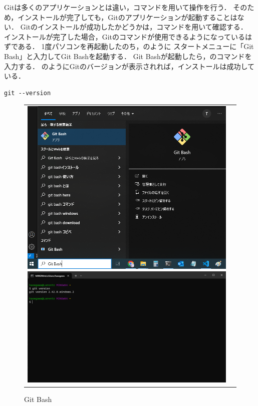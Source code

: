 Gitは多くのアプリケーションとは違い，コマンドを用いて操作を行う．
そのため，インストールが完了しても，Gitのアプリケーションが起動することはない．
Gitのインストールが成功したかどうかは，コマンドを用いて確認する．
インストールが完了した場合，Gitのコマンドが使用できるようになっているはずである．
1度パソコンを再起動したのち，のように
スタートメニューに「Git Bash」と入力してGit Bashを起動する．
Git Bashが起動したら，のコマンドを入力する．
のようにGitのバージョンが表示されれば，インストールは成功している．

\begin{lstlisting}[caption=Gitのバージョン確認コマンド, label=lst:git_version]
  git --version
\end{lstlisting}

\begin{figure}[h]
  \begin{tabular}{cc}
      \begin{minipage}{.5\textwidth}
          \centering
          \includegraphics[width=1.0\linewidth]{figure/appendix/git_bash.png}
          \caption{Git Bash}
          \label{fig:git_bash} %
      \end{minipage}
      \begin{minipage}{.5\textwidth}
          \centering
          \includegraphics[width=1.0\linewidth]{figure/appendix/git_version.png}

\end{minipage}
\end{tabular}
\end{figure}
